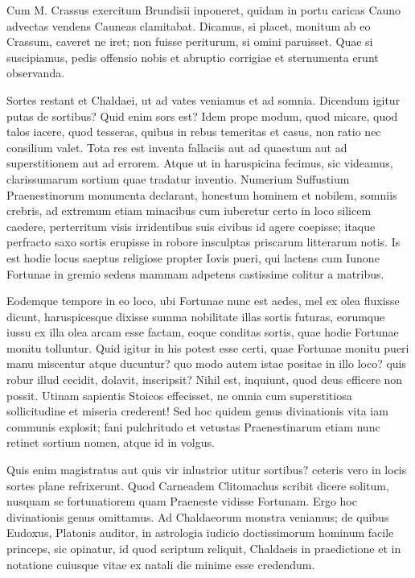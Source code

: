  Cum M. Crassus exercitum Brundisii inponeret, quidam in portu caricas Cauno advectas vendens Cauneas clamitabat. Dicamus, si placet, monitum ab eo Crassum, caveret ne iret; non fuisse periturum, si omini paruisset. Quae si suscipiamus, pedis offensio nobis et abruptio corrigiae et sternumenta erunt observanda.

 Sortes restant et Chaldaei, ut ad vates veniamus et ad somnia. Dicendum igitur putas de sortibus? Quid enim sors est? Idem prope modum, quod micare, quod talos iacere, quod tesseras, quibus in rebus temeritas et casus, non ratio nec consilium valet. Tota res est inventa fallaciis aut ad quaestum aut ad superstitionem aut ad errorem. Atque ut in haruspicina fecimus, sic videamus, clarissumarum sortium quae tradatur inventio. Numerium Suffustium Praenestinorum monumenta declarant, honestum hominem et nobilem, somniis crebris, ad extremum etiam minacibus cum iuberetur certo in loco silicem caedere, perterritum visis irridentibus suis civibus id agere coepisse; itaque perfracto saxo sortis erupisse in robore insculptas priscarum litterarum notis. Is est hodie locus saeptus religiose propter Iovis pueri, qui lactens cum Iunone Fortunae in gremio sedens mammam adpetens castissime colitur a matribus.

 Eodemque tempore in eo loco, ubi Fortunae nunc est aedes, mel ex olea fluxisse dicunt, haruspicesque dixisse summa nobilitate illas sortis futuras, eorumque iussu ex illa olea arcam esse factam, eoque conditas sortis, quae hodie Fortunae monitu tolluntur. Quid igitur in his potest esse certi, quae Fortunae monitu pueri manu miscentur atque ducuntur? quo modo autem istae positae in illo loco? quis robur illud cecidit, dolavit, inscripsit? Nihil est, inquiunt, quod deus efficere non possit. Utinam sapientis Stoicos effecisset, ne omnia cum superstitiosa sollicitudine et miseria crederent! Sed hoc quidem genus divinationis vita iam communis explosit; fani pulchritudo et vetustas Praenestinarum etiam nunc retinet sortium nomen, atque id in volgus.

 Quis enim magistratus aut quis vir inlustrior utitur sortibus? ceteris vero in locis sortes plane refrixerunt. Quod Carneadem Clitomachus scribit dicere solitum, nusquam se fortunatiorem quam Praeneste vidisse Fortunam. Ergo hoc divinationis genus omittamus. Ad Chaldaeorum monstra veniamus; de quibus Eudoxus, Platonis auditor, in astrologia iudicio doctissimorum hominum facile princeps, sic opinatur, id quod scriptum reliquit, Chaldaeis in praedictione et in notatione cuiusque vitae ex natali die minime esse credendum.

